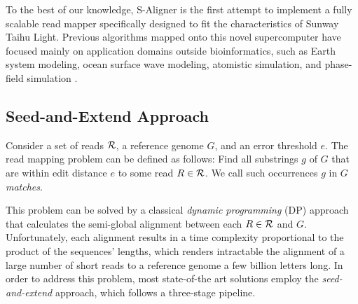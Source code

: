 \documentclass[conference]{IEEEtran}
\begin{document}
To the best of our knowledge, S-Aligner is the first attempt to implement a fully scalable read mapper specifically designed to fit the characteristics of Sunway Taihu Light. Previous algorithms mapped onto this novel supercomputer have focused mainly on application domains outside bioinformatics, such as Earth system modeling, ocean surface wave modeling, atomistic simulation, and phase-field simulation \cite{sunway}.

\subsection{Seed-and-Extend Approach}

Consider a set of reads ${\cal R}$, a reference genome $G$, and an error threshold $e$. The read mapping problem can be defined as follows: Find all substrings $g$ of $G$ that are within edit distance $e$ to some read $R \in {\cal R}$. We call such occurrences $g$ in $G$ {\em matches}.

This problem can be solved by a classical {\em dynamic programming} (DP) approach that calculates the semi-global alignment between each $R \in {\cal R}$ and $G$. Unfortunately, each alignment results in a time complexity proportional to the product of the sequences' lengths, which renders intractable the alignment of a large number of short reads to a reference genome a few billion letters long.  In order to address this problem, most state-of-the art solutions \cite{Reinert} employ the {\em seed-and-extend} approach, which follows a three-stage pipeline.
\end{document}
